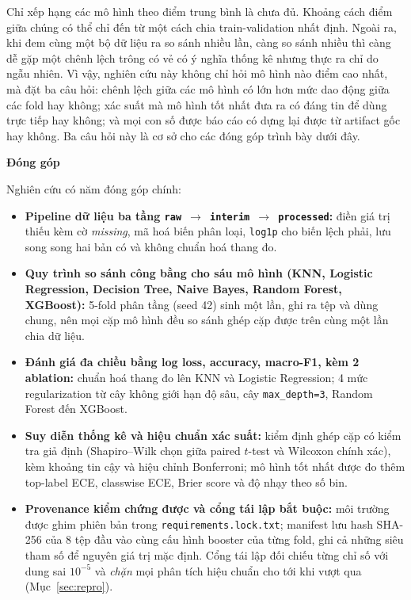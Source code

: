 \documentclass[12pt]{template/ai_conquer2026}
\begin{document}
Chỉ xếp hạng các mô hình theo điểm trung bình là chưa đủ. Khoảng cách điểm giữa
chúng có thể chỉ đến từ một cách chia train-validation nhất định. Ngoài ra, khi
đem cùng một bộ dữ liệu ra so sánh nhiều lần, càng so sánh nhiều thì càng dễ gặp
một chênh lệch trông có vẻ có ý nghĩa thống kê nhưng thực ra chỉ do ngẫu nhiên.
Vì vậy, nghiên cứu này không chỉ hỏi mô hình nào điểm cao nhất, mà đặt ba câu
hỏi: chênh lệch giữa các mô hình có lớn hơn mức dao động giữa các fold hay
không; xác suất mà mô hình tốt nhất đưa ra có đáng tin để dùng trực tiếp hay
không; và mọi con số được báo cáo có dựng lại được từ artifact gốc hay không.
Ba câu hỏi này là cơ sở cho các đóng góp trình bày dưới đây.

\noindent\textbf{Đóng góp}
\label{sec:contrib}

Nghiên cứu có năm đóng góp chính:

\begin{itemize}
\item \textbf{Pipeline dữ liệu ba tầng \texttt{raw $\rightarrow$ interim
$\rightarrow$ processed}:} điền giá trị thiếu kèm cờ \emph{missing}, mã hoá biến
phân loại, \texttt{log1p} cho biến lệch phải, lưu song song hai bản có và không
chuẩn hoá thang đo.

\item \textbf{Quy trình so sánh công bằng cho sáu mô hình (KNN, Logistic Regression,
Decision Tree, Naive Bayes, Random Forest, XGBoost):} 5-fold phân tầng (seed 42)
sinh một lần, ghi ra tệp và dùng chung, nên mọi cặp mô hình đều so sánh ghép cặp
được trên cùng một lần chia dữ liệu.

\item \textbf{Đánh giá đa chiều bằng log loss, accuracy, macro-F1, kèm 2
ablation:} chuẩn hoá thang đo lên KNN và Logistic Regression; 4 mức
regularization từ cây không giới hạn độ sâu, cây \texttt{max\_depth=3}, Random
Forest đến XGBoost.

\item \textbf{Suy diễn thống kê và hiệu chuẩn xác suất:} kiểm định ghép cặp có
kiểm tra giả định (Shapiro--Wilk chọn giữa paired $t$-test và Wilcoxon chính xác),
kèm khoảng tin cậy và hiệu chỉnh Bonferroni; mô hình tốt nhất được đo thêm
top-label ECE, classwise ECE, Brier score và độ nhạy theo số bin.

\item \textbf{Provenance kiểm chứng được và cổng tái lập bắt buộc:} môi trường
được ghim phiên bản trong \texttt{requirements.lock.txt}; manifest lưu hash
SHA-256 của 8 tệp đầu vào cùng cấu hình booster của từng fold, ghi cả những
siêu tham số để nguyên giá trị mặc định. Cổng tái lập đối chiếu từng chỉ số với
dung sai $10^{-5}$ và \emph{chặn} mọi phân tích hiệu chuẩn cho tới khi vượt qua
(Mục~\ref{sec:repro}).
\end{itemize}
\end{document}
